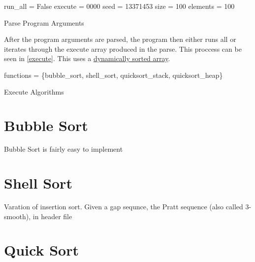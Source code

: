 \documentclass[12pt]{article}
\begin{document}
    \begin{algorithm}
        run\_all = False\;
		execute = 0000
        seed = 13371453
        size = 100
        elements = 100

        \caption{Parse Program Arguments}\label{parse}
    \end{algorithm}

    After the program arguments are parsed, the program then either runs all or iterates through the execute array produced in the parse. This proccess can be seen in \vref{execute}. 
    This uses a \href{https://www.geeksforgeeks.org/dynamic-memory-allocation-in-c-using-malloc-calloc-free-and-realloc/}{dynamically sorted array}.

    \begin{algorithm}
		functions = \{bubble\_sort, shell\_sort, quicksort\_stack, quicksort\_heap\}\;

        \caption{Execute Algorithms}\label{execute}
    \end{algorithm}

    \section{Bubble Sort}

    Bubble Sort is fairly easy to implement

    \section{Shell Sort}

    Varation of insertion sort.
    Given a gap sequnce, the Pratt sequence (also called 3-smooth), in header file
    \section{Quick Sort}
\end{document}
